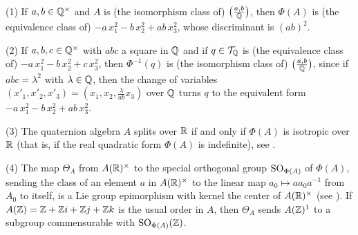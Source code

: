 \documentclass[11pt]{article}
\begin{document}
\medskip
(1) If $a,b\in {\mathbb Q}^\times$ and $A$ is (the isomorphism class of)
  $\big(\frac{a,b}{{\mathbb Q}}\big)$, then $\Phi(A)$ is (the equivalence
  class of) $-a \,x_1^2 -b \,x_2^2 + ab \, x_3^2$, whose discriminant
  is $(ab)^2$.

\medskip
(2) If $a,b,c\in {\mathbb Q}^\times$ with $abc$ a square in ${\mathbb Q}$ and
  if $q\in {\cal T}_{\mathbb Q}$ is (the equivalence class of) $-a \,x_1^2 -b
  \,x_2^2 + c \, x_3^2$, then $\Phi^{-1}(q)$ is (the isomorphism class
  of) $\big(\frac{a,b}{{\mathbb Q}}\big)$, since if $abc= \lambda^2$ with
  $\lambda\in{\mathbb Q}$, then the change of variables $(x'_1,x'_2,x'_3)=
  (x_1,x_2,\frac{\lambda}{ab}x_3)$ over ${\mathbb Q}$ turns $q$ to the
  equivalent form $-a \,x_1^2 -b \,x_2^2 + ab \, x_3^2$.

\medskip
(3) The quaternion algebra $A$ splits over ${\mathbb R}$ if and only if
  $\Phi(A)$ is isotropic over ${\mathbb R}$ (that is, if the real quadratic
  form $\Phi(A)$ is indefinite), see \cite[Coro I.3.2]{Vigneras80}.

\medskip
(4) The map $\Theta_A$ from $A({\mathbb R})^\times$ to the special
  orthogonal group $\operatorname{SO}_{\Phi(A)}$ of $\Phi(A)$, sending the class of
  an element $a$ in $A({\mathbb R})^\times$ to the linear map $a_0\mapsto a
  a_0 a^{-1}$ from $A_0$ to itself, is a Lie group epimorphism with
  kernel the center of $A({\mathbb R})^\times$ (see
  \cite[Th.~2.4.1]{MacRei03}).  If $A({\mathbb Z})={\mathbb Z}+{\mathbb Z} i+{\mathbb Z} j+{\mathbb Z} k$ is
  the usual order in $A$, then $\Theta_A$ sends $A({\mathbb Z})^{1}$ to a
  subgroup commensurable with $\operatorname{SO}_{\Phi(A)}({\mathbb Z})$.
\end{document}
